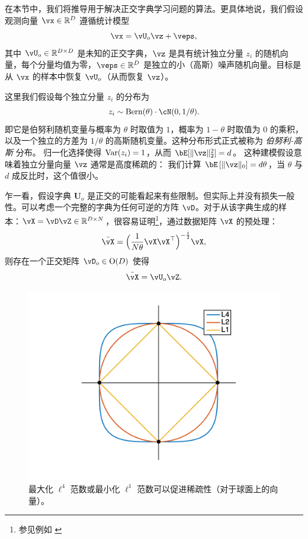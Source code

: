 \documentclass[../../book-main_zh.tex]{subfiles}
\begin{document}
在本节中，我们将推导用于解决正交字典学习问题的算法。更具体地说，我们假设观测向量 $\vx \in \R^D$ 遵循统计模型
\begin{equation}
    \vx = \vU_o \vz + \veps, 
    \label{eq:ica-model-ch2}
\end{equation}
其中 $\vU_o \in \R^{D \times D}$ 是未知的正交字典，$\vz$ 是具有统计独立分量 $z_i$ 的随机向量，每个分量均值为零，$\veps \in \R^D$ 是独立的小（高斯）噪声随机向量。目标是从 $\vx$ 的样本中恢复 $\vU_o$（从而恢复 $\vz$）。

这里我们假设每个独立分量 $z_i$ 的分布为 $$z_i \sim \mathrm{Bern}(\theta) \cdot \cN(0, 1/\theta).$$ 即它是伯努利随机变量与概率为 $\theta$ 时取值为 $1$，概率为 $1-\theta$ 时取值为 $0$ 的乘积，以及一个独立的方差为 $1/\theta$ 的高斯随机变量。这种分布形式正式被称为 {\em 伯努利-高斯} 分布。 
归一化选择使得 $\operatorname{Var}(z_i) = 1$，从而 $\bE[\norm{\vz}_2^2]=d$。 
这种建模假设意味着独立分量向量 $\vz$ 通常是高度稀疏的： 
我们计算 $\bE\left[\norm{\vz}_0\right] = d\theta$，当 $\theta$ 与 $d$ 成反比时，这个值很小。

\begin{remark}[正交假设] 
乍一看，假设字典 $\bm U_o$ 是正交的可能看起来有些限制。但实际上并没有损失一般性。可以考虑一个完整的字典为任何可逆的方阵 $\vD$。对于从该字典生成的样本：$\vX = \vD \vZ \in \mathbb{R}^{D\times N}$，很容易证明\footnote{参见例如 \cite{sun2017completeI}}，通过数据矩阵 $\vX$ 的预处理： 
\begin{equation}
    \bar{\vX} = \Big(\frac{1}{N\theta} \vX\vX^\top\Big)^{-\frac{1}{2}}\vX,
\end{equation}
则存在一个正交矩阵 $\vD_o \in \mathrm{O}(D)$ 使得
\begin{equation}
    \bar{\vX} = \vU_o\vZ.
\end{equation}
\end{remark}

\begin{figure}
    \centering
    \includegraphics[width=0.6\linewidth]{figs_chap2/2DL4Sphere.png}
    \caption{最大化 $\ell^4$ 范数或最小化 $\ell^1$ 范数可以促进稀疏性（对于球面上的向量）。}
    \label{fig:L4-sphere}
\end{figure}
\end{document}
